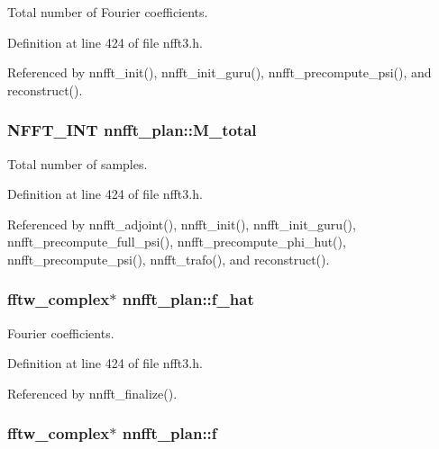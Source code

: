 Total number of Fourier coefficients. 



Definition at line 424 of file nfft3.\-h.



Referenced by nnfft\-\_\-init(), nnfft\-\_\-init\-\_\-guru(), nnfft\-\_\-precompute\-\_\-psi(), and reconstruct().

\hypertarget{structnnfft__plan_a3ae8600600f003c1c9932847d695588d}{
\subsubsection[{M\-\_\-total}]{\setlength{\rightskip}{0pt plus 5cm}N\-F\-F\-T\-\_\-\-I\-N\-T nnfft\-\_\-plan\-::\-M\-\_\-total}}\label{structnnfft__plan_a3ae8600600f003c1c9932847d695588d}


Total number of samples. 



Definition at line 424 of file nfft3.\-h.



Referenced by nnfft\-\_\-adjoint(), nnfft\-\_\-init(), nnfft\-\_\-init\-\_\-guru(), nnfft\-\_\-precompute\-\_\-full\-\_\-psi(), nnfft\-\_\-precompute\-\_\-phi\-\_\-hut(), nnfft\-\_\-precompute\-\_\-psi(), nnfft\-\_\-trafo(), and reconstruct().

\hypertarget{structnnfft__plan_ab13f0f93fe991a5831ff78312f9b9e4b}{
\subsubsection[{f\-\_\-hat}]{\setlength{\rightskip}{0pt plus 5cm}fftw\-\_\-complex$\ast$ nnfft\-\_\-plan\-::f\-\_\-hat}}\label{structnnfft__plan_ab13f0f93fe991a5831ff78312f9b9e4b}


Fourier coefficients. 



Definition at line 424 of file nfft3.\-h.



Referenced by nnfft\-\_\-finalize().

\hypertarget{structnnfft__plan_a773de7440f04f7d3e23419cd94caa2eb}{
\subsubsection[{f}]{\setlength{\rightskip}{0pt plus 5cm}fftw\-\_\-complex$\ast$ nnfft\-\_\-plan\-::f}}\label{structnnfft__plan_a773de7440f04f7d3e23419cd94caa2eb}


